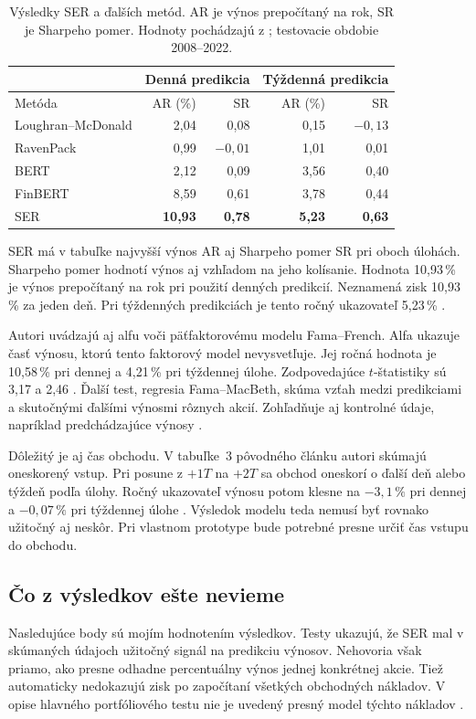\begin{table}[htbp]
\centering
\caption{Výsledky SER a ďalších metód. AR je výnos prepočítaný na rok, SR je Sharpeho pomer. Hodnoty pochádzajú z ; testovacie obdobie 2008--2022.}
\label{tab:results}
\small
\begin{tabular}{lrrrr}
\toprule
& \multicolumn{2}{c}{Denná predikcia} & \multicolumn{2}{c}{Týždenná predikcia}\\
\midrule
Metóda & AR (\%) & SR & AR (\%) & SR\\
\midrule
Loughran--McDonald & 2,04 & 0,08 & 0,15 & $-0,13$\\
RavenPack & 0,99 & $-0,01$ & 1,01 & 0,01\\
BERT & 2,12 & 0,09 & 3,56 & 0,40\\
FinBERT & 8,59 & 0,61 & 3,78 & 0,44\\
SER & \textbf{10,93} & \textbf{0,78} & \textbf{5,23} & \textbf{0,63}\\
\bottomrule
\end{tabular}
\end{table}

SER má v tabuľke najvyšší výnos AR aj Sharpeho pomer SR pri oboch úlohách. Sharpeho pomer hodnotí výnos aj vzhľadom na jeho kolísanie. Hodnota 10,93\,\% je výnos prepočítaný na rok pri použití denných predikcií. Neznamená zisk 10,93\,\% za jeden deň. Pri týždenných predikciách je tento ročný ukazovateľ 5,23\,\% .

Autori uvádzajú aj alfu voči päťfaktorovému modelu Fama--French. Alfa ukazuje časť výnosu, ktorú tento faktorový model nevysvetľuje. Jej ročná hodnota je 10,58\,\% pri dennej a 4,21\,\% pri týždennej úlohe. Zodpovedajúce $t$-štatistiky sú 3,17 a 2,46 . Ďalší test, regresia Fama--MacBeth, skúma vzťah medzi predikciami a skutočnými ďalšími výnosmi rôznych akcií. Zohľadňuje aj kontrolné údaje, napríklad predchádzajúce výnosy .

Dôležitý je aj čas obchodu. V tabuľke~3 pôvodného článku autori skúmajú oneskorený vstup. Pri posune z $+1T$ na $+2T$ sa obchod oneskorí o ďalší deň alebo týždeň podľa úlohy. Ročný ukazovateľ výnosu potom klesne na $-3,1\,\%$ pri dennej a $-0,07\,\%$ pri týždennej úlohe . Výsledok modelu teda nemusí byť rovnako užitočný aj neskôr. Pri vlastnom prototype bude potrebné presne určiť čas vstupu do obchodu.

\subsection{Čo z výsledkov ešte nevieme}
Nasledujúce body sú mojím hodnotením výsledkov. Testy ukazujú, že SER mal v skúmaných údajoch užitočný signál na predikciu výnosov. Nehovoria však priamo, ako presne odhadne percentuálny výnos jednej konkrétnej akcie. Tiež automaticky nedokazujú zisk po započítaní všetkých obchodných nákladov. V opise hlavného portfóliového testu nie je uvedený presný model týchto nákladov .

